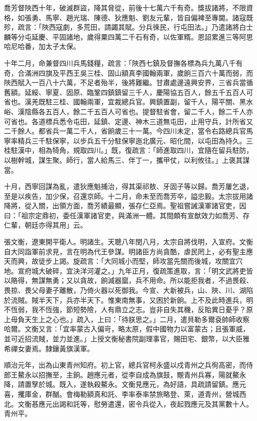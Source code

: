 \begin{pinyinscope}
喬芳督陜西十年，破滅群盜，降其脅從，前後十七萬六千有奇。獎拔諸將，不限資格，如張勇、馬寧、趙光瑞、陳德、狄應魁、劉友元輩，皆自偏裨至專閫。諸寇既殄，疏言：「陜西寇劇，多荒田，請蠲其賦。分兵徠民，行屯田法。」乃遣諸將白士麟等分屯延慶、平固諸地，歲得粟四萬二千石有奇，以佐軍糈。恩詔累進三等阿思哈尼哈番，加太子太保。

十年二月，命兼督四川兵馬錢糧，疏言：「陜西七鎮及督撫各標為兵九萬八千有奇，合滿洲四旗及平西王吳三桂、固山額真李國翰兩軍，歲餉三百六十萬而弱，而陜西賦入一百八十六萬，不足者殆半，後將難繼。甘肅處邊遠興安界，三省兵當循舊額。延綏、寧夏、固原、臨鞏四鎮鎮留三千人，慶陽協五百人，餘五千五百人可省也。漢羌既駐三桂、國翰兩軍，宜裁總兵官。興鎮置副，留千人，陽平關、黑水峪、漢陰縣各五百人，餘二千五百人可省也。提督駐省會，留二千人，餘二千人亦可省也。各道標兵悉令屯田，延鎮、定邊、神木三道無屯田，止用守兵，計所省又二千餘人。都省兵一萬二千人，省餉歲三十一萬。今四川未定，當令右路總兵官馬寧率精兵三千駐保寧，以步兵五千分駐保寧迤北廣元、昭化間，以屯田為持久。三桂駐漢中，相為犄角，規取四川。」既，復疏言：「師進取四川，宜隨在留兵駐防，以樹幹城，謀生聚。師行，當人給馬三、伴丁一，攜甲仗，以利攸往。」上褒其謀當。

十月，西寧回謀為亂，遣狄應魁捕治，得其渠祁敖、牙固子等以歸。喬芳屢乞退，至是以疾告，加少保，召還京師。十二月，命未至而喬芳卒，謚忠毅。太宗拔用諸降將，從入關，出領方面，喬芳績最顯，張存仁亞焉。聖祖嘗誡漢軍諸官吏，因曰：「祖宗定鼎初，委任漢軍諸官吏，與滿洲一體。其間頗有宣猷效力如喬芳、存仁輩，朝廷亦得其用」云。

張文衡，遼東開平衛人。明諸生。天聰八年閏八月，太宗自將伐明，入宣府。文衡自大同詣軍前求見，言在明為代王參謀。明諸臣方尚貪酷，虐民罔上，必有聖主應天而興，故徒步上謁。旋疏言：「大同城小而堅，師攻當先關而後城，攻關宜穴地。宣府城大破碎，宜決洋河灌之。」九年正月，復疏策進取，言：「明文武將吏皆以賂得，無謀無勇；又以貪故，餉減器窳，兵不用命。所以能拒我者，不過畏殺、畏掠、畏父母妻子離散，乃倚火器以死御我。今宣、大新被兵，山、陜、川、湖陷於流賊。賊半天下，兵亦半天下。惟東南無事，又困於新餉。上不及此時進兵，明不恆弱，我不恆強，節短勢險，人有鼎立之志。豈非自失其機，反貽異日憂乎？原上毋負天生上之心也。」疏入，上曰：「待朕思之。」二月，遣貝勒多爾袞帥師收察哈爾。文衡又言：「宜率蒙古入偏岢，略太原，假中國物力以富蒙古；且張軍威，並可近招流賊，並力並進。」上授文衡秘書院副理事官，賜田宅、銀幣，以大臣雅希禪女妻焉。隸鑲黃旗漢軍。

順治元年，出為山東青州知府。初上官，總兵官柯永盛以戍青州之兵徇高密，而侍郎王鰲永以招撫至，主餉。趙應元者，從李自成為旗鼓，覸青州兵寡，陽就鰲永降，請置孥於城。既入，遂執殺鰲永。文衡見應元，為好語，具疏請留鎮。應元喜，攫庫金，群酗。會梅勒額真和託、李率泰率禁旅略登、萊，道青州，營城西北。文衡惎應元出謁和託等，慰勞遣還，密令兵從入，夜起戮應元及其黨數十人。青州平。


\end{pinyinscope}
